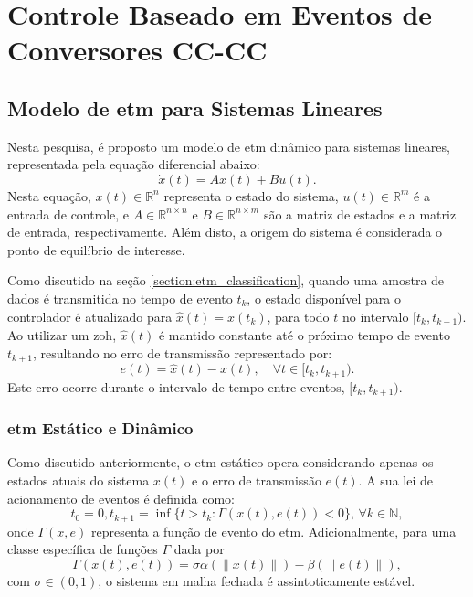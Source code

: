 \chapter{Controle Baseado em Eventos de Conversores CC-CC} \label{cap4}



\section{Modelo de \acrshort{etm} para Sistemas Lineares}

Nesta pesquisa, é proposto um modelo de \acrshort{etm} dinâmico para sistemas lineares, representada pela equação diferencial abaixo: \begin{equation} \dot{x}(t) = Ax(t) + Bu(t). \label{eq:linear_system_etm}\end{equation} Nesta equação, $ x(t) \in \mathbb{R}^n $ representa o estado do sistema, $ u(t) \in \mathbb{R}^m $ é a entrada de controle, e $ A \in \mathbb{R}^{n \times n} $ e $ B \in \mathbb{R}^{n \times m}$ são a matriz de estados e a matriz de entrada, respectivamente. Além disto, a origem do sistema é considerada o ponto de equilíbrio de interesse.

Como discutido na seção \ref{section:etm_classification}, quando uma amostra de dados é transmitida no tempo de evento $t_k$, o estado disponível para o controlador é atualizado para $\hat{x}(t) = x(t_k)$, para todo $t$ no intervalo $[t_k, t_{k+1})$. Ao utilizar um \acrshort{zoh}, $\hat{x}(t)$ é mantido constante até o próximo tempo de evento $t_{k+1}$, resultando no erro de transmissão representado por: \begin{equation}
  e(t) = \hat{x}(t) - x(t), \quad \forall t \in [t_k, t_{k+1}).
\end{equation} Este erro ocorre durante o intervalo de tempo entre eventos, $ [t_k, t_{k+1})$.


\subsection{\acrshort{etm} Estático e Dinâmico}

Como discutido anteriormente, o \acrshort{etm} estático opera considerando apenas os estados atuais do sistema $x(t)$ e o erro de transmissão $e(t)$. A sua lei de acionamento de eventos é definida como: \begin{equation} t_0 = 0, t_{k+1} = \inf \{t > t_k : \Gamma(x(t), e(t)) < 0 \}, \, \forall k \in \mathbb{N},\end{equation} onde $\Gamma(x, e)$ representa a função de evento do \acrshort{etm}. Adicionalmente, para uma classe específica de funções $\Gamma$ dada por \begin{equation}
  \Gamma(x(t), e(t)) = \sigma \alpha(\|x(t)\|) - \beta(\|e(t)\|),
\end{equation} com $\sigma \in (0,1)$, o sistema em malha fechada é assintoticamente estável.

